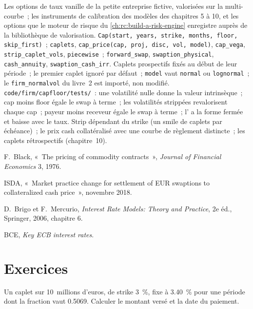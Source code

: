 \begin{build}
 Les options de taux vanille de la petite entreprise fictive, valorisées sur la
multi-courbe~; les instruments de calibration des modèles des chapitres 5 à 10, et
les options que le moteur de risque du \cref{ch:rc:build-a-risk-engine} enregistre
auprès de la bibliothèque de valorisation.
 \texttt{Cap(start, years, strike, months, floor, skip\_first)}~;
\texttt{caplets}, \texttt{cap\_price(cap, proj, disc, vol, model)},
\texttt{cap\_vega}, \texttt{strip\_caplet\_vols}, \texttt{piecewise}~;
\texttt{forward\_swap}, \texttt{swaption\_physical}, \texttt{cash\_annuity},
\texttt{swaption\_cash\_irr}.
 Caplets prospectifs fixés au début de leur période~; le
premier caplet ignoré par défaut~; \texttt{model} vaut \texttt{normal} ou
\texttt{lognormal}~; le \texttt{firm\_normalvol} du livre~2 est importé, non modifié.
 \texttt{code/firm/capfloor/tests/}~: une volatilité nulle
donne la valeur intrinsèque~; cap moins floor égale le swap à terme~; les volatilités strippées
revalorisent chaque cap~; payeur moins receveur égale le swap à terme~; l' a la
forme fermée et baisse avec le taux.
 Strip dépendant du strike (un smile de caplets par échéance)~; le
prix cash collatéralisé avec une courbe de règlement distincte~; les caplets rétrospectifs
(chapitre~10).
\end{build}

\begin{omsources}
\item F.\ Black, «~The pricing of commodity contracts~», \emph{Journal of
Financial Economics} 3, 1976.
\item ISDA, «~Market practice change for settlement of EUR swaptions to
collateralized cash price~», novembre 2018.
\item D.\ Brigo et F.\ Mercurio, \emph{Interest Rate Models: Theory and
Practice}, 2e éd., Springer, 2006, chapitre 6.
\item BCE, \emph{Key ECB interest rates}.
\end{omsources}

\section{Exercices}

\begin{exercise}[$\star$]\label{exo:rc:vanilla-rates-options:1}
Un caplet sur 10~millions d'euros, de strike 3~\%, fixe à 3.40~\% pour une période
dont la fraction vaut 0.5069. Calculer le montant versé et la date du paiement.
\end{exercise}

